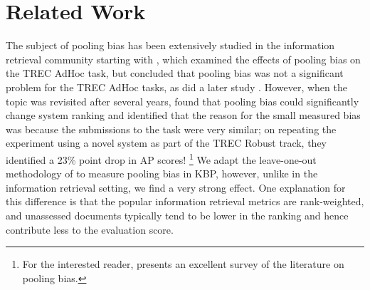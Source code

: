 \section{Related Work}
\label{sec:related}

The subject of pooling bias has been extensively studied in the information retrieval community starting with \citet{zobel1998reliable}, which examined the effects of pooling bias on the TREC AdHoc task, but concluded that pooling bias was not a significant problem for the TREC AdHoc tasks, as did a later study \citep{voorhees1999overview}.
However, when the topic was revisited after several years, \citet{buckley2004incomplete} found that pooling bias could significantly change system ranking and \citet{buckley2007bias} identified that the reason for the small measured bias was because the submissions to the task were very similar; on repeating the experiment using a novel system as part of the TREC Robust track, they identified a 23\% point drop in AP scores!%
\footnote{For the interested reader, \citet{weber2010measurement} presents an excellent survey of the literature on pooling bias.}
We adapt the leave-one-out methodology of \citet{zobel1998reliable} to measure pooling bias in KBP, however, unlike in the information retrieval setting, we find a very strong effect.
One explanation for this difference is that the popular information retrieval metrics are rank-weighted, and unassessed documents typically tend to be lower in the ranking and hence contribute less to the evaluation score.

